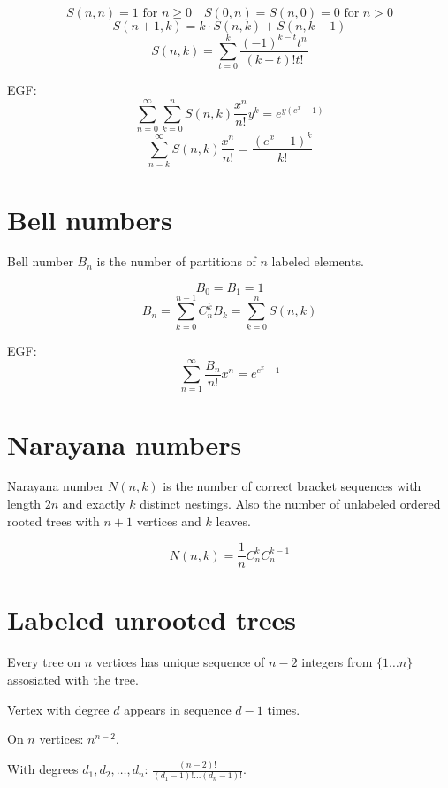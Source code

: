 $$S(n, n) = 1 \text{ for } n \ge 0 \quad S(0, n) = S(n, 0) = 0 \text{ for } n > 0$$
$$S(n + 1, k) = k \cdot S(n, k) + S(n, k - 1)$$
$$S(n, k) = \sum_{t = 0}^{k} \frac{(-1)^{k - t}t^n}{(k - t)!t!}$$

EGF:
$$\sum_{n = 0}^{\infty}\sum_{k=0}^{n} S(n, k)\frac{x^n}{n!}y^k = e^{y(e^x - 1)}$$
$$\sum_{n = k}^{\infty} S(n, k)\frac{x^n}{n!} = \frac{(e^x - 1)^k}{k!}$$




\section{Bell numbers}
Bell number $B_n$ is the number of partitions of $n$ labeled elements.

$$B_0 = B_1 = 1$$
$$B_n = \sum_{k = 0}^{n - 1} C_n^k B_k = \sum_{k = 0}^{n} S(n, k)$$

EGF:
$$\sum_{n = 1}^{\infty}\frac{B_n}{n!}x^n = e^{e^x - 1}$$




\section{Narayana numbers}
Narayana number $N(n, k)$ is the number of correct bracket sequences with length $2n$ and exactly $k$ distinct nestings. Also the number of unlabeled ordered rooted trees with $n + 1$ vertices and $k$ leaves.

$$N(n, k) = \frac{1}{n}C_{n}^{k}C_{n}^{k - 1}$$



\section{Labeled unrooted trees}
Every tree on $n$ vertices has unique sequence of $n - 2$ integers from $\{1 \dots n\}$ assosiated with the tree.

Vertex with degree $d$ appears in sequence $d - 1$ times.

On $n$ vertices: $n^{n - 2}$.

With degrees $d_1, d_2, \dots, d_n$: $\frac{(n - 2)!}{(d_1 - 1)! \dots (d_n - 1)!}$.